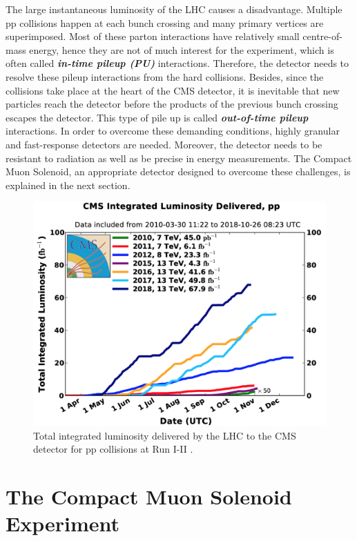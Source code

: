 The large instantaneous luminosity of the LHC causes a disadvantage. Multiple pp collisions happen at each bunch crossing and many primary vertices are superimposed. Most of these parton interactions have relatively small centre-of-mass energy, hence they are not of much interest for the experiment, which is often called \textbf{\emph{in-time pileup (PU)}} interactions. Therefore, the detector needs to resolve these pileup interactions from the hard collisions. Besides, since the collisions take place at the heart of the CMS detector, it is inevitable that new particles reach the detector before the products of the previous bunch crossing escapes the detector. This type of pile up is called \textbf{\emph{out-of-time pileup}} interactions. In order to overcome these demanding conditions, highly granular and fast-response detectors are needed. Moreover, the detector needs to be resistant to radiation as well as be precise in energy measurements. The Compact Muon Solenoid, an appropriate detector designed to overcome these challenges, is explained in the next section.

\begin{figure}[ht]
	\centering
	\includegraphics[scale=0.4]{MSc_Thesis/fig/CMSlumi.png}
	\vspace{2mm}
	\caption[Total integrated luminosity delivered by the LHC to the CMS detector for pp collisions at Run I-II.]
	{Total integrated luminosity delivered by the LHC to the CMS detector for pp collisions at Run I-II \cite{CMSlumi}.}
	\label{CMSlumi}
\end{figure}

\section{The Compact Muon Solenoid Experiment}

